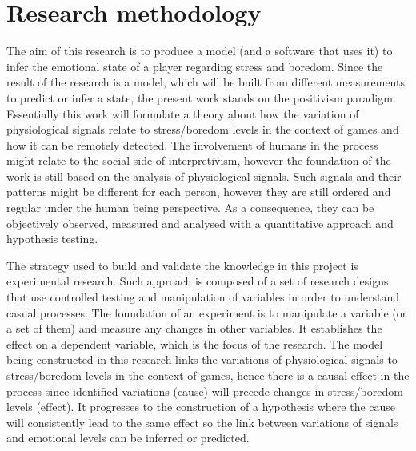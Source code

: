 \chapter{Research methodology}

The aim of this research is to produce a model (and a software that uses it) to infer the emotional state of a player regarding stress and boredom. Since the result of the research is a model, which will be built from different measurements to predict or infer a state, the present work stands on the positivism paradigm. Essentially this work will formulate a theory about how the variation of physiological signals relate to stress/boredom levels in the context of games and how it can be remotely detected. The involvement of humans in the process might relate to the social side of interpretivism, however the foundation of the work is still based on the analysis of physiological signals. Such signals and their patterns might be different for each person, however they are still ordered and regular under the human being perspective. As a consequence, they can be objectively observed, measured and analysed with a quantitative approach and hypothesis testing.

The strategy used to build and validate the knowledge in this project is experimental research. Such approach is composed of a set of research designs that use controlled testing and manipulation of variables in order to understand casual processes. The foundation of an experiment is to manipulate a variable (or a set of them) and measure any changes in other variables. It establishes the effect on a dependent variable, which is the focus of the research. The model being constructed in this research links the variations of physiological signals to stress/boredom levels in the context of games, hence there is a causal effect in the process since identified variations (cause) will precede changes in stress/boredom levels (effect). It progresses to the construction of a hypothesis where the cause will consistently lead to the same effect so the link between variations of signals and emotional levels can be inferred or predicted.



